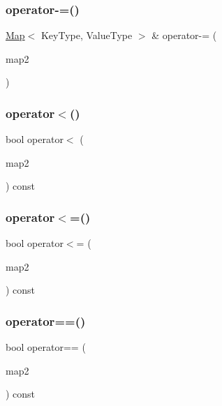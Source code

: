 \subsubsection{\texorpdfstring{operator-\/=()}{operator-=()}}
{\footnotesize\ttfamily \mbox{\hyperlink{classMap}{Map}}$<$ Key\+Type, Value\+Type $>$ \& operator-\/= (\begin{DoxyParamCaption}\item[{const \mbox{\hyperlink{classMap}{Map}}$<$ Key\+Type, Value\+Type $>$ \&}]{map2 }\end{DoxyParamCaption})}

\mbox{\label{classMap_aa7853d8fda7f6e2e8a353dfed157c376}} 
\subsubsection{\texorpdfstring{operator$<$()}{operator<()}}
{\footnotesize\ttfamily bool operator$<$ (\begin{DoxyParamCaption}\item[{const \mbox{\hyperlink{classMap}{Map}}$<$ Key\+Type, Value\+Type $>$ \&}]{map2 }\end{DoxyParamCaption}) const}

\mbox{\label{classMap_a91d581dcc2a8ff2a83aa7854e9166dc9}} 
\subsubsection{\texorpdfstring{operator$<$=()}{operator<=()}}
{\footnotesize\ttfamily bool operator$<$= (\begin{DoxyParamCaption}\item[{const \mbox{\hyperlink{classMap}{Map}}$<$ Key\+Type, Value\+Type $>$ \&}]{map2 }\end{DoxyParamCaption}) const}

\mbox{\label{classMap_a5dda0121a37510aec1dcf9cd53ba21e8}} 
\subsubsection{\texorpdfstring{operator==()}{operator==()}}
{\footnotesize\ttfamily bool operator== (\begin{DoxyParamCaption}\item[{const \mbox{\hyperlink{classMap}{Map}}$<$ Key\+Type, Value\+Type $>$ \&}]{map2 }\end{DoxyParamCaption}) const}

